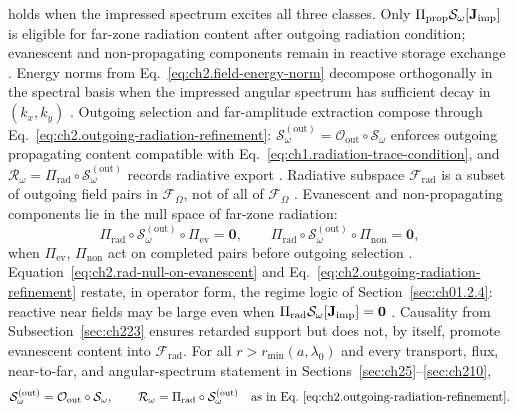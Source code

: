 holds when the impressed spectrum excites all three classes. Only
\(\Pi_{\mathrm{prop}}\mathcal{S}_\omega[\mathbf{J}_{\mathrm{imp}}]\) is eligible for far-zone radiation
content after outgoing radiation condition; evanescent and non-propagating components remain in
reactive storage exchange \cite{stratton1941}. Energy norms from
Eq.~\eqref{eq:ch2.field-energy-norm} decompose orthogonally in the spectral basis
when the impressed angular spectrum has sufficient decay in \((k_x,k_y)\)
\cite{stratton1941}.
Outgoing selection and far-amplitude extraction compose through
Eq.~\eqref{eq:ch2.outgoing-radiation-refinement}:
$\mathcal{S}_\omega^{\mathrm{(out)}}=\mathcal{O}_{\mathrm{out}}\circ\mathcal{S}_\omega$ enforces
outgoing propagating content compatible with Eq.~\eqref{eq:ch1.radiation-trace-condition},
and $\mathcal{R}_\omega=\Pi_{\mathrm{rad}}\circ\mathcal{S}_\omega^{\mathrm{(out)}}$ records radiative
export \cite{stratton1941}. Radiative subspace \(\mathcal{F}_{\mathrm{rad}}\) is a
subset of outgoing field pairs in \(\mathcal{F}_\Omega\), not of all of
\(\mathcal{F}_\Omega\) \cite{harrington2001}. Evanescent and non-propagating
components lie in the null space of far-zone radiation:
\begin{equation}
\label{eq:ch2.rad-null-on-evanescent}
\Pi_{\mathrm{rad}}\circ\mathcal{S}_\omega^{\mathrm{(out)}}\circ\Pi_{\mathrm{ev}}=\mathbf{0},\qquad
\Pi_{\mathrm{rad}}\circ\mathcal{S}_\omega^{\mathrm{(out)}}\circ\Pi_{\mathrm{non}}=\mathbf{0},
\end{equation}
when \(\Pi_{\mathrm{ev}}\), \(\Pi_{\mathrm{non}}\) act on completed pairs before outgoing selection
\cite{stratton1941}. Equation~\eqref{eq:ch2.rad-null-on-evanescent} and
Eq.~\eqref{eq:ch2.outgoing-radiation-refinement} restate, in operator form, the regime
logic of Section~\ref{sec:ch01.2.4}: reactive near fields may be large even when
\(\Pi_{\mathrm{rad}}\mathcal{S}_\omega[\mathbf{J}_{\mathrm{imp}}]=\mathbf{0}\) \cite{harrington2001}.
Causality from Subsection~\ref{sec:ch223} ensures retarded support but does not,
by itself, promote evanescent content into \(\mathcal{F}_{\mathrm{rad}}\).
\medskip
For all \(r>r_{\min}(a,\lambda_0)\) and every transport, flux, near-to-far, and angular-spectrum
statement in Sections~\ref{sec:ch25}--\ref{sec:ch210},
\begin{equation*}
\mathcal{S}_\omega^{\mathrm{(out)}}=\mathcal{O}_{\mathrm{out}}\circ\mathcal{S}_\omega,
\qquad
\mathcal{R}_\omega=\Pi_{\mathrm{rad}}\circ\mathcal{S}_\omega^{\mathrm{(out)}}
\quad\text{as in Eq.~\eqref{eq:ch2.outgoing-radiation-refinement}.}
\end{equation*}

